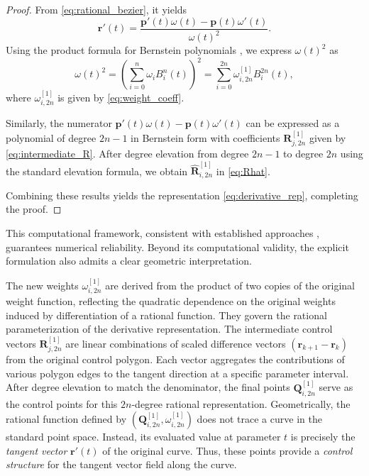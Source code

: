 \documentclass[preprint,12pt]{elsarticle}
\begin{document}
\begin{proof}
From \eqref{eq:rational_bezier}, it yields
\begin{equation}\label{eq:quotient}
\mathbf{r}'(t) = \frac{\mathbf{p}'(t)\omega(t) - \mathbf{p}(t)\omega'(t)}{\omega(t)^2}.
\end{equation}
 Using the product formula for Bernstein polynomials \cite{Farouki1988}, we express $\omega(t)^2$ as
\[
\omega(t)^2 = \left(\sum_{i=0}^n \omega_i B^n_i(t)\right)^2 = \sum_{i=0}^{2n} \omega^{[1]}_{i,2n} B^{2n}_i(t),
\]
where $\omega^{[1]}_{i,2n}$ is given by \eqref{eq:weight_coeff}. 

Similarly, the numerator $\mathbf{p}'(t)\omega(t) - \mathbf{p}(t)\omega'(t)$ can be expressed as a polynomial of degree $2n-1$ in Bernstein form with coefficients $\mathbf{R}^{[1]}_{j,2n}$ given by \eqref{eq:intermediate_R}. After degree elevation from degree $2n-1$ to degree $2n$ using the standard elevation formula, we obtain $\widehat{\mathbf{R}}^{[1]}_{i,2n}$ in \eqref{eq:Rhat}.

Combining these results yields the representation \eqref{eq:derivative_rep}, completing the proof.
\end{proof}
This computational framework, consistent with established approaches \cite{Piegl1997,piegl1997a}, guarantees numerical reliability. 
Beyond its computational validity, the explicit formulation also admits a clear geometric interpretation. 

 The new weights $\omega_{i,2n}^{[1]}$ are derived from the product of two copies of the original weight function, reflecting the quadratic dependence on the original weights induced by differentiation of a rational function. They govern the rational parameterization of the derivative representation. The intermediate control vectors $\mathbf{R}_{j,2n}^{[1]}$ are linear combinations of scaled difference vectors $(\mathbf{r}_{k+1} - \mathbf{r}_k)$ from the original control polygon. Each vector aggregates the contributions of various polygon edges to the tangent direction at a specific parameter interval. After degree elevation to match the denominator, the final points $\mathbf{Q}_{i,2n}^{[1]}$ serve as the control points for this $2n$-degree rational representation. Geometrically, the rational function defined by $\left( \mathbf{Q}_{i,2n}^{[1]}, \omega_{i,2n}^{[1]} \right)$ does not trace a curve in the standard point space. Instead, its evaluated value at parameter $t$ is precisely the \emph{tangent vector} $\mathbf{r}'(t)$ of the original curve. Thus, these points provide a \emph{control structure} for the tangent vector field along the curve.
\end{document}
